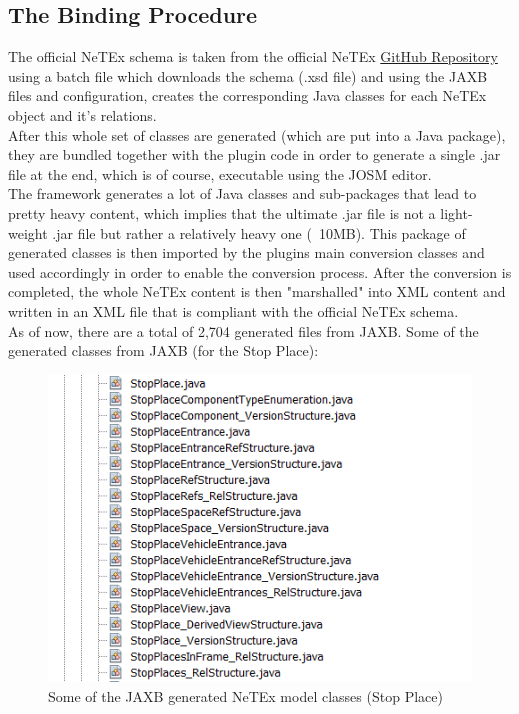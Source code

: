 \subsection{The Binding Procedure}
The official NeTEx schema is taken from the official NeTEx \href{https://github.com/NeTEx-CEN/NeTEx}{GitHub Repository} using a batch file which downloads the schema (.xsd file) and using the JAXB files and configuration, creates the corresponding Java classes for each NeTEx object and it's relations.\\
After this whole set of classes are generated (which are put into a Java package), they are bundled together with the plugin code in order to generate a single .jar file at the end, which is of course, executable using the JOSM editor.\\
The framework generates a lot of Java classes and sub-packages that lead to pretty heavy content, which implies that the ultimate .jar file is not a light-weight .jar file but rather a relatively heavy one (~10MB). This package of generated classes is then imported by the plugins main conversion classes and used accordingly in order to enable the conversion process. After the conversion is completed, the whole NeTEx content is then "marshalled" into XML content and written in an XML file that is compliant with the official NeTEx schema.\\
As of now, there are a total of 2,704 generated files from JAXB.
\newpage
Some of the generated classes from JAXB (for the Stop Place):
\begin{figure}[H]
\includegraphics[width=\linewidth]{./Images/Implementation/jaxb_generated_classes.png}
	\caption{Some of the JAXB generated NeTEx model classes (Stop Place)}
\end{figure}
\newpage
